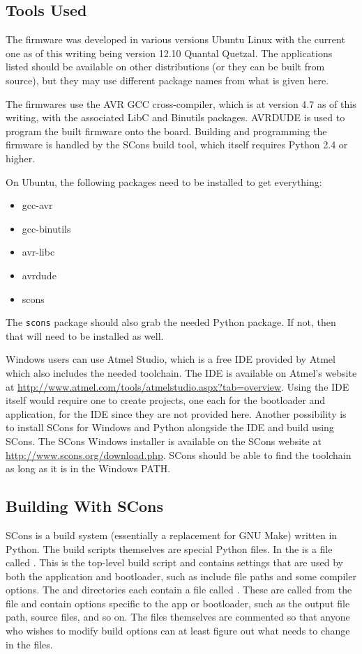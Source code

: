 \documentclass{article}
\begin{document}
\subsection{Tools Used} \label{ssec:FWTools}
The firmware was developed in various versions Ubuntu Linux with the current one as of this writing
being version 12.10 Quantal Quetzal.  The applications listed should be available on other
distributions (or they can be built from source), but they may use different package names from what
is given here.

The firmwares use the AVR GCC cross-compiler, which is at version 4.7 as of this writing, with
the associated LibC and Binutils packages.  AVRDUDE is used to program the built firmware onto the
board.  Building and programming the firmware is handled by the SCons build tool, which itself
requires Python 2.4 or higher.

On Ubuntu, the following packages need to be installed to get everything:

\begin{itemize}
  \item gcc-avr
  \item gcc-binutils
  \item avr-libc
  \item avrdude
  \item scons
\end{itemize}

The \texttt{scons} package should also grab the needed Python package.  If not, then that will need to be
installed as well.

Windows users can use Atmel Studio, which is a free IDE provided by Atmel which also includes the
needed toolchain.  The IDE is available on Atmel's website at
\url{http://www.atmel.com/tools/atmelstudio.aspx?tab=overview}.  Using the IDE itself would require
one to create projects, one each for the bootloader and application, for the IDE since they are not
provided here.  Another possibility is to install SCons for Windows and Python alongside the IDE and
build using SCons.  The SCons Windows installer is available on the SCons website at
\url{http://www.scons.org/download.php}.  SCons should be able to find the toolchain as long as it
is in the Windows PATH.

\subsection{Building With SCons} \label{ssec:FWBuilding}
SCons is a build system (essentially a replacement for GNU Make) written in Python.  The build
scripts themselves are special Python files.  In the  is a file called
.  This is the top-level build script and contains settings that are used by both
the application and bootloader, such as include file paths and some compiler options.  The
 and  directories each contain a file called
.  These are called from the  file and contain options
specific to the app or bootloader, such as the output file path, source files, and so on.  The files
themselves are commented so that anyone who wishes to modify build options can at least figure out
what needs to change in the files.
\end{document}
